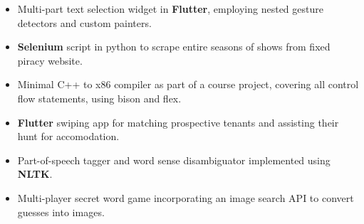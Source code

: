 \begin{itemize}[itemsep = -1.3 mm, leftmargin=*]
    \item Multi-part text selection widget in \textbf{Flutter}, employing nested gesture detectors and custom painters.
    \item \textbf{Selenium} script in python to scrape entire seasons of shows from fixed piracy website.
    \item Minimal C++ to x86 compiler as part of a course project, covering all control flow statements, using bison and flex.
    \item \textbf{Flutter} swiping app for matching prospective tenants and assisting their hunt for accomodation.
    \item Part-of-speech tagger and word sense disambiguator implemented using \textbf{NLTK}.
    \item Multi-player secret word game incorporating an image search API to convert guesses into images.
\end{itemize}